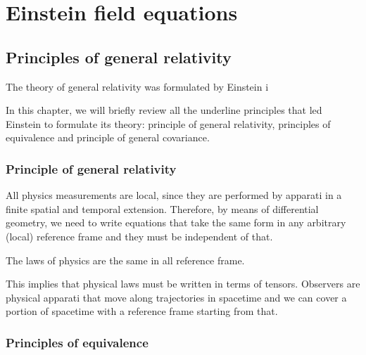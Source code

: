 \part{Einstein field equations}

\chapter{Principles of general relativity}

    The theory of general relativity was formulated by Einstein i


In this chapter, we will briefly review all the underline principles that led Einstein to formulate its theory: principle of general relativity, principles of equivalence and principle of general covariance.

\section{Principle of general relativity}

    All physics measurements are local, since they are performed by apparati in a finite spatial and temporal extension. Therefore, by means of differential geometry, we need to write equations that take the same form in any arbitrary (local) reference frame and they must be independent of that. 
    \begin{princ}
        The laws of physics are the same in all reference frame.
    \end{princ}
    This implies that physical laws must be written in terms of tensors. Observers are physical apparati that move along trajectories in spacetime and we can cover a portion of spacetime with a reference frame starting from that.
    
\section{Principles of equivalence}

